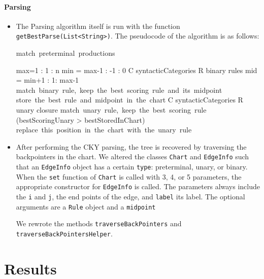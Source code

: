 \documentclass{article}
\begin{document}
\paragraph{Parsing}
\begin{itemize}
\item 
The Parsing algorithm itself is run with the function {\tt getBestParse(List<String>)}. The pseudocode of the algorithm is as follows:
\begin{program}
\mbox{match preterminal productions}

\FOR max=1 : 1 :  n
      \FOR min = max-1 : -1 : 0
              \FOREACH C \in syntacticCategories
\FOREACH R \in binary rules
\FOR mid = min+1 : 1: max-1
	          \mbox{match binary rule, keep the best scoring rule and its midpoint}
\END
\END
              \mbox{store the best rule and midpoint in the chart}
\END
 \FOREACH C \in syntacticCategories
\FOREACH R \in unary closure
 \mbox{match unary rule, keep the best scoring rule}
\END
\IF (bestScoringUnary > bestStoredInChart)
\mbox{replace this position in the chart with the unary rule}
           
\END
\END
\END
\END

\end{program}
\item After performing the CKY parsing, the tree is recovered by traversing the backpointers in the chart. 
We altered the classes {\tt Chart} and {\tt EdgeInfo} such that an {\tt EdgeInfo} object has a certain {\tt type}: preterminal, unary, or binary. When the {\tt set} function of {\tt Chart} is called with 3, 4, or 5 parameters, the appropriate constructor for {\tt EdgeInfo} is called. The parameters always include the {\tt i} and {\tt j}, the end points of the edge, and {\tt label} its label. The optional arguments are a {\tt Rule} object and a {\tt midpoint}

We rewrote the methods {\tt traverseBackPointers} and {\tt traverseBackPointersHelper}. 
\end{itemize}

\section{Results}
\end{document}
